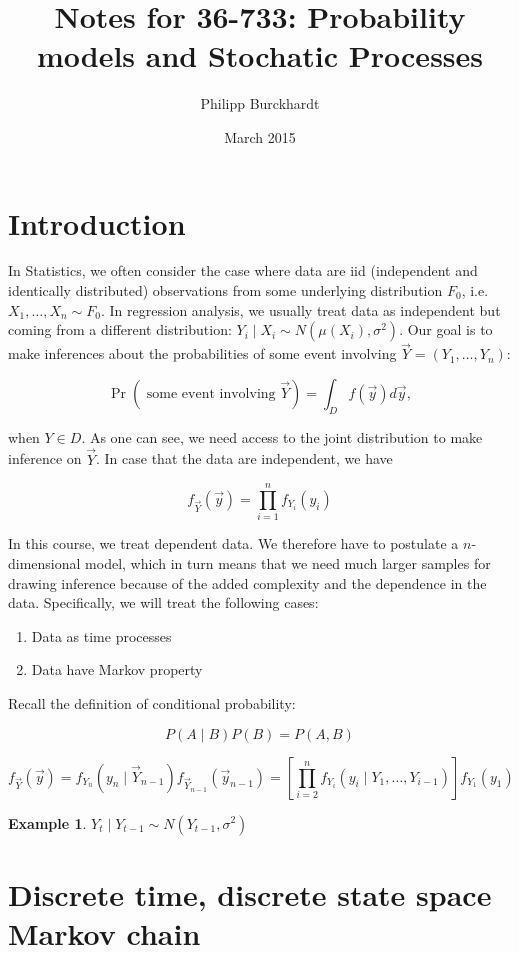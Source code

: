 \documentclass{article}
\title{Notes for 36-733: Probability models and Stochatic Processes}
\author{Philipp Burckhardt}
\date{March 2015}
\theoremstyle{definition}
\newtheorem{exmp}{Example}[section]
\begin{document}
\maketitle

\section{Introduction}

In Statistics, we often consider the case where data are iid (independent and identically distributed) observations from some underlying distribution $F_0$, i.e. $X_1, \ldots, X_n \sim F_0$. In regression analysis, we usually treat data as independent but coming from a different distribution:
$Y_i \mid X_i \sim N \left( \mu(X_i), \sigma^2 \right)$.
Our goal is to make inferences about the probabilities of some event involving $\vec{Y} = \left( Y_1, \ldots, Y_n \right)$:

$$
\Pr \left( \text{ some event involving } \vec{Y} \right) = \int_D f(\vec{y}) d\vec{y},
$$

when $Y \in D$. As one can see, we need access to the joint distribution to make inference on $\vec{Y}$.
In case that the data are independent, we have

$$
f_{\vec{Y}} \left( \vec{y} \right) = \prod_{i=1}^n f_{Y_i} \left(y_i \right)
$$

In this course, we treat dependent data. We therefore have to postulate a $n$-dimensional model, which in turn means that we need much larger samples for drawing inference because of the added complexity and the dependence in the data.
Specifically, we will treat the following cases:
\begin{enumerate}
\item Data as time processes
\item Data have Markov property
\end{enumerate}

Recall the definition of conditional probability:

$$
P (A \mid B) P(B) = P(A, B)
$$

$$
f_{\vec{Y}} \left( \vec{y} \right) = f_{Y_n} ( y_n \mid \vec{Y}_{n-1} ) f_{\vec{Y}_{n-1}} ( \vec{y}_{n-1} ) = \left[ \prod_{i=2}^n f_{Y_i} (y_i \mid Y_1, \ldots, Y_{i-1} ) \right] f_{Y_1} (y_1)
$$

\begin{exmp}
$Y_t \mid Y_{t-1} \sim N \left( Y_{t-1}, \sigma^2 \right)$
\end{exmp}

\section{Discrete time, discrete state space Markov chain}
\end{document}

